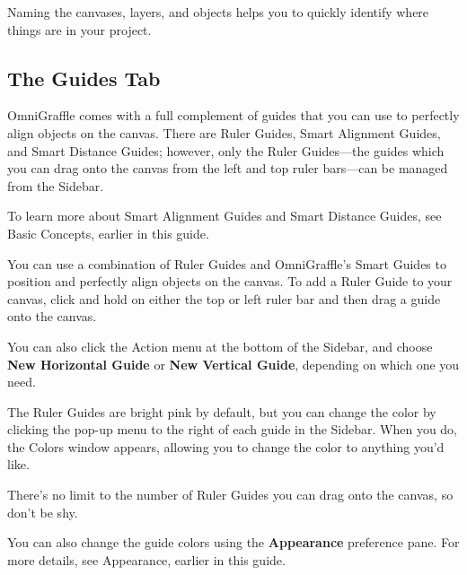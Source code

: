 \documentclass[../main.tex]{subfiles}
\begin{document}

Naming the canvases, layers, and objects helps you to quickly identify where things are in your
project.

\subsection{The Guides Tab }

OmniGraffle comes with a full complement of guides that you can use to perfectly align objects
on the canvas. There are Ruler Guides, Smart Alignment Guides, and Smart Distance Guides;
however, only the Ruler Guides---the guides which you can drag onto the canvas from the left
and top ruler bars---can be managed from the Sidebar.

\begin{ognote}
  To learn more about Smart Alignment Guides and Smart Distance Guides, see Basic Concepts,
  earlier in this guide.
\end{ognote}

You can use a combination of Ruler Guides and OmniGraffle's Smart Guides to position and
perfectly align objects on the canvas. To add a Ruler Guide to your canvas, click and hold on
either the top or left ruler bar and then drag a guide onto the canvas.


You can also click the Action menu at the bottom of the Sidebar, and choose \textbf{New
Horizontal Guide} or \textbf{New Vertical Guide}, depending on which one you need.


The Ruler Guides are bright pink by default, but you can change the color by clicking the pop-up
menu to the right of each guide in the Sidebar. When you do, the Colors window appears,
allowing you to change the color to anything you'd like.


There's no limit to the number of Ruler Guides you can drag onto the canvas, so don't be shy.

\begin{ogtip}
  You can also change the guide colors using the \textbf{Appearance} preference pane. For more
  details, see Appearance, earlier in this guide.
\end{ogtip}
\end{document}
